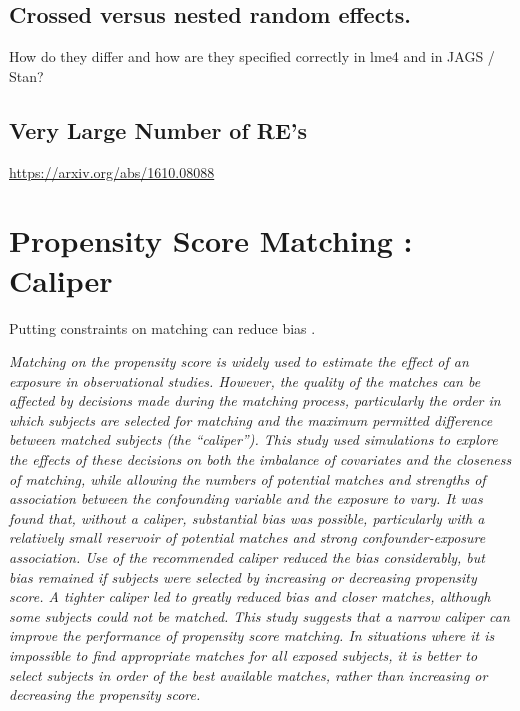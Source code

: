 \documentclass[
  11pt,
]{book}
\begin{document}
\hypertarget{crossed-versus-nested-random-effects.}{%
\section{Crossed versus nested random effects.}\label{crossed-versus-nested-random-effects.}}

How do they differ and how are they specified correctly in lme4 and in JAGS / Stan?

\hypertarget{very-large-number-of-res}{%
\section{Very Large Number of RE's}\label{very-large-number-of-res}}

\url{https://arxiv.org/abs/1610.08088}

\hypertarget{propensity-score-matching-caliper-1}{%
\chapter{Propensity Score Matching : Caliper}\label{propensity-score-matching-caliper-1}}

Putting constraints on matching can reduce bias \citep{10.1093/aje/kwt212}.

\emph{Matching on the propensity score is widely used to estimate the effect of an exposure in observational studies. However, the quality of the matches can be affected by decisions made during the matching process, particularly the order in which subjects are selected for matching and the maximum permitted difference between matched subjects (the ``caliper''). This study used simulations to explore the effects of these decisions on both the imbalance of covariates and the closeness of matching, while allowing the numbers of potential matches and strengths of association between the confounding variable and the exposure to vary. It was found that, without a caliper, substantial bias was possible, particularly with a relatively small reservoir of potential matches and strong confounder-exposure association. Use of the recommended caliper reduced the bias considerably, but bias remained if subjects were selected by increasing or decreasing propensity score. A tighter caliper led to greatly reduced bias and closer matches, although some subjects could not be matched. This study suggests that a narrow caliper can improve the performance of propensity score matching. In situations where it is impossible to find appropriate matches for all exposed subjects, it is better to select subjects in order of the best available matches, rather than increasing or decreasing the propensity score.}
\end{document}
